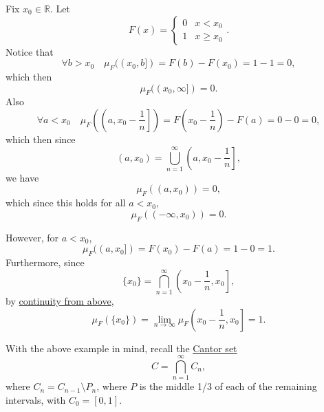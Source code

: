 \documentclass[notoc,notitlepage]{tufte-book}
\begin{document}
\begin{eg}
  Fix $x_0 \in \mathbb{R}$. Let
  \begin{equation*}
    F(x) = \begin{cases}
      0 & x < x_0 \\
      1 & x \geq x_0
    \end{cases}.
  \end{equation*}
  Notice that
  \begin{equation*}
    \forall b > x_0 \quad
    \mu_F((x_0, b]) = F(b) - F(x_0) = 1 - 1 = 0,
  \end{equation*}
  which then
  \begin{equation*}
    \mu_F((x_0, \infty]) = 0.
  \end{equation*}
  Also
  \begin{equation*}
    \forall a < x_0 \quad
    \mu_F \left( \left( a, x_0 - \frac{1}{n} \right] \right)
    = F \left(x_0 - \frac{1}{n} \right) - F(a) = 0 - 0 = 0,
  \end{equation*}
  which then since
  \begin{equation*}
    (a, x_0) = \bigcup_{n=1}^{\infty} \left( a, x_0 - \frac{1}{n} \right],
  \end{equation*}
  we have
  \begin{equation*}
    \mu_F((a, x_0)) = 0,
  \end{equation*}
  which since this holds for all $a < x_0$,
  \begin{equation*}
    \mu_F((-\infty, x_0)) = 0.
  \end{equation*}

  However, for $a < x_0$,
  \begin{equation*}
    \mu_F((a, x_0]) = F(x_0) - F(a) = 1 - 0 = 1.
  \end{equation*}
  Furthermore, since
  \begin{equation*}
    \{ x_0 \} = \bigcap_{n=1}^{\infty} \left( x_0 - \frac{1}{n}, x_0 \right],
  \end{equation*}
  by \hyperref[thm:properties_of_a_measure]{continuity from above},
  \begin{equation*}
    \mu_F(\{ x_0 \})
    = \lim_{n \to \infty} \mu_F \left( x_0 - \frac{1}{n}, x_0 \right] = 1.
  \end{equation*}
\end{eg}

With the above example in mind, recall the
\href{https://tex.japorized.ink/PMATH450/classnotes.pdf\#chapter.5}{Cantor set}
\begin{equation*}
  C = \bigcap_{n=1}^{\infty} C_n,
\end{equation*}
where $C_n = C_{n-1} \setminus P_n$,
where $P$ is the middle 1/3 of each of the remaining intervals,
with $C_0 = [0, 1]$.
\end{document}

